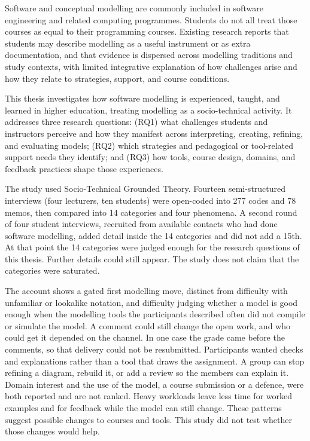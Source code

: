 
%

Software and conceptual modelling are commonly included in software engineering and related computing programmes. Students do not all treat those courses as equal to their programming courses. Existing research reports that students may describe modelling as a useful instrument or as extra documentation, and that evidence is dispersed across modelling traditions and study contexts, with limited integrative explanation of how challenges arise and how they relate to strategies, support, and course conditions.

This thesis investigates how software modelling is experienced, taught, and learned in higher education, treating modelling as a socio-technical activity. It addresses three research questions: (RQ1) what challenges students and instructors perceive and how they manifest across interpreting, creating, refining, and evaluating models; (RQ2) which strategies and pedagogical or tool-related support needs they identify; and (RQ3) how tools, course design, domains, and feedback practices shape those experiences.

The study used Socio-Technical Grounded Theory. Fourteen semi-structured interviews (four lecturers, ten students) were open-coded into 277 codes and 78 memos, then compared into 14 categories and four phenomena. A second round of four student interviews, recruited from available contacts who had done software modelling, added detail inside the 14 categories and did not add a 15th. At that point the 14 categories were judged enough for the research questions of this thesis. Further details could still appear. The study does not claim that the categories were saturated.

The account shows a gated first modelling move, distinct from difficulty with unfamiliar or lookalike notation, and difficulty judging whether a model is good enough when the modelling tools the participants described often did not compile or simulate the model. A comment could still change the open work, and who could get it depended on the channel. In one case the grade came before the comments, so that delivery could not be resubmitted. Participants wanted checks and explanations rather than a tool that draws the assignment. A group can stop refining a diagram, rebuild it, or add a review so the members can explain it. Domain interest and the use of the model, a course submission or a defence, were both reported and are not ranked. Heavy workloads leave less time for worked examples and for feedback while the model can still change. These patterns suggest possible changes to courses and tools. This study did not test whether those changes would help.

